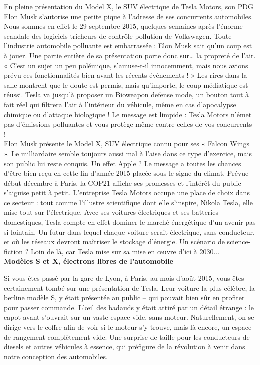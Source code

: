 \documentclass[8pt]{article}
\begin{document}
En pleine présentation du Model X, le SUV électrique de Tesla Motors, son PDG Elon Musk s’autorise une petite pique à l’adresse de ses concurrents automobiles. Nous sommes en effet le 29 septembre 2015, quelques semaines après l’énorme scandale des logiciels tricheurs de contrôle pollution de Volkswagen. Toute l’industrie automobile polluante est embarrassée : Elon Musk sait qu’un coup est à jouer. Une partie entière de sa présentation porte donc sur… la propreté de l’air. « C’est un sujet un peu polémique, s’amuse-t-il innocemment, mais nous avions prévu ces fonctionnalités bien avant les récents événements ! » Les rires dans la salle montrent que le doute est permis, mais qu’importe, le coup médiatique est réussi. Tesla va jusqu’à proposer un Bioweapon defense mode, un bouton tout à fait réel qui filtrera l’air à l’intérieur du véhicule, même en cas d’apocalypse chimique ou d’attaque biologique ! Le message est limpide : Tesla Motors n’émet pas d’émissions polluantes et vous protège même contre celles de vos concurrents !\\

Elon Musk présente le Model X, SUV électrique connu pour ses « Falcon Wings ». Le milliardaire semble toujours aussi mal à l’aise dans ce type d’exercice, mais son public lui reste conquis. Un effet Apple ?
Le message a toutes les chances d’être bien reçu en cette fin d’année 2015 placée sous le signe du climat. Prévue début décembre à Paris, la COP21 affiche ses promesses et l’intérêt du public s’aiguise petit à petit. L’entreprise Tesla Motors occupe une place de choix dans ce secteur : tout comme l’illustre scientifique dont elle s’inspire, Nikola Tesla, elle mise tout sur l’électrique. Avec ses voitures électriques et ses batteries domestiques, Tesla compte en effet dominer le marché énergétique d’un avenir pas si lointain. Un futur dans lequel chaque voiture serait électrique, sans conducteur, et où les réseaux devront maîtriser le stockage d'énergie. Un scénario de science-fiction ? Loin de là, car Tesla mise sur sa mise en œuvre d’ici à 2030...\\

\textbf{Modèles S et X, électrons libres de l’automobile}

Si vous êtes passé par la gare de Lyon, à Paris, au mois d’août 2015, vous êtes certainement tombé sur une présentation de Tesla. Leur voiture la plus célèbre, la berline modèle S, y était présentée au public – qui pouvait bien sûr en profiter pour passer commande. L’œil des badauds y était attiré par un détail étrange : le capot avant s’ouvrait sur un vaste espace vide, sans moteur. Naturellement, on se dirige vers le coffre afin de voir si le moteur s’y trouve, mais là encore, un espace de rangement complètement vide. Une surprise de taille pour les conducteurs de diesels et autres véhicules à essence, qui préfigure de la révolution à venir dans notre conception des automobiles. \\
\end{document}

